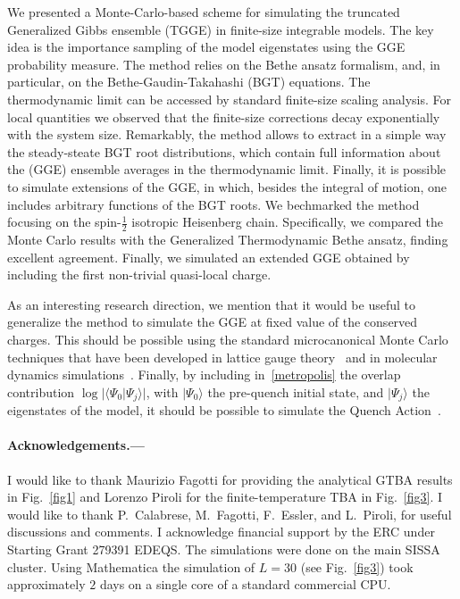 \documentclass[twocolumn,superscriptaddress,prb,10pt]{revtex4-1}
\begin{document}
We presented a Monte-Carlo-based scheme for simulating the truncated Generalized 
Gibbs ensemble (TGGE) in finite-size integrable models. The key idea is the importance 
sampling of the model eigenstates using the GGE probability measure. The method relies 
on the Bethe ansatz formalism, and, in particular, on the Bethe-Gaudin-Takahashi (BGT) 
equations. The thermodynamic limit can be accessed by standard finite-size scaling analysis. 
For local quantities we observed that the finite-size corrections decay exponentially 
with the system size. 
Remarkably, the method allows to extract in a simple way the steady-steate BGT root 
distributions, which contain full information about the (GGE) ensemble averages 
in the thermodynamic limit. Finally, it is possible to simulate extensions of 
the GGE, in which, besides the integral of motion, one includes arbitrary functions 
of the BGT roots. We bechmarked the method focusing on the spin-$\frac{1}{2}$ isotropic 
Heisenberg chain. Specifically, we compared the Monte Carlo results with the Generalized 
Thermodynamic Bethe ansatz, finding excellent agreement. Finally, we simulated 
an extended GGE obtained by including the first non-trivial quasi-local charge. 

As an interesting research direction, we mention that it would be useful to generalize the 
method to simulate the GGE at fixed value of the conserved charges. This should be possible 
using the standard microcanonical Monte Carlo techniques that have been developed in lattice 
gauge theory~\cite{creutz-1983} and in molecular dynamics simulations~\cite{lustig-1998}. 
Finally, by including in~\eqref{metropolis} the overlap contribution 
$\log|\langle\Psi_0|\Psi_j\rangle|$, with $|\Psi_0\rangle$ the pre-quench initial state, 
and $|\Psi_j\rangle$ the eigenstates of the model,  it should be possible to simulate the 
Quench Action~\cite{prep}.

\paragraph*{Acknowledgements.---}
I would like to thank Maurizio Fagotti for providing the analytical GTBA results in 
Fig.~\ref{fig1} and Lorenzo Piroli for the finite-temperature TBA in Fig.~\ref{fig3}. 
I would like to thank P.~Calabrese, M.~Fagotti, F.~Essler, and L.~Piroli,  for useful 
discussions and comments. I acknowledge financial support by the ERC under Starting 
Grant 279391 EDEQS. The simulations were done on the main SISSA cluster. Using Mathematica 
the simulation of $L=30$ (see Fig.~\ref{fig3}) took approximately $2$ days on a single core 
of a standard commercial CPU. 
\end{document}
